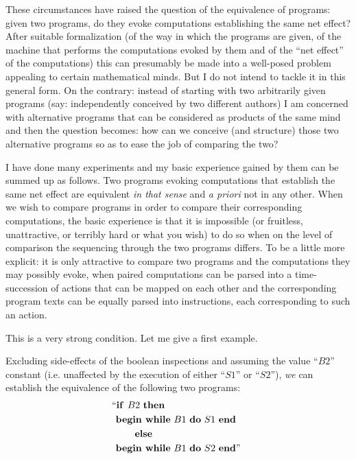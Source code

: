 These circumstances have raised the question of the equivalence of programs: given two programs, do they evoke computations establishing the same net effect? After suitable formalization (of the way in which the programs are given, of the machine that performs the computations evoked by them and of the ``net effect'' of the computations) this can presumably be made into a well-posed problem appealing to certain mathematical minds. But I do not intend to tackle it in this general form. On the contrary: instead of starting with two arbitrarily given programs (say: independently conceived by two different authors) I am concerned with alternative programs that can be considered as products of the same mind and then the question becomes: how can we conceive (and structure) those two alternative programs so as to ease the job of comparing the two?

I have done many experiments and my basic experience gained by them can be summed up as follows. Two programs evoking computations that establish the same net effect are equivalent \textit{in that sense} and \textit{a priori} not in any other. When we wish to compare programs in order to compare their corresponding computations, the basic experience is that it is impossible (or fruitless, unattractive, or terribly hard or what you wish) to do so when on the level of comparison the sequencing through the two programs differs. To be a little more explicit: it is only attractive to compare two programs and the computations they may possibly evoke, when paired computations can be parsed into a time-succession of actions that can be mapped on each other and the corresponding program texts can be equally parsed into instructions, each corresponding to such an action.

This is a very strong condition. Let me give a first example.

Excluding side-effects of the boolean inspections and assuming the value ``$B2$'' constant (i.e. unaffected by the execution of either ``$S1$'' or ``$S2$''), \textit{we} can establish the equivalence of the following two programs:
\begin{equation}
	\label{eq:comparing-example-1}
	\begin{split}
	&\text{\hspace{-.4em}``\textbf{if }} B2\text{ \textbf{then}}\\
	&\text{\textbf{begin while} } B1\text{ \textbf{do} } S1 \text{ \textbf{end}}\\
	&\qquad\text{\textbf{else}}\\
	&\text{\textbf{begin while} } B1\text{ \textbf{do} } S2\text{ \textbf{end}''}
	\end{split}
\end{equation}

